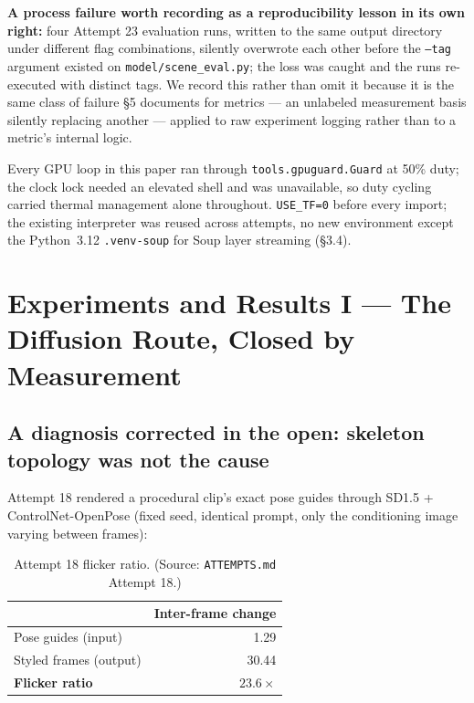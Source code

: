 \documentclass[11pt]{article}
\newcommand{\secsym}{\S}
\begin{document}
\textbf{A process failure worth recording as a reproducibility lesson in
its own right:} four Attempt 23 evaluation runs, written to the same
output directory under different flag combinations, silently overwrote
each other before the \texttt{--tag} argument existed on
\texttt{model/scene\_eval.py}; the loss was caught and the runs
re-executed with distinct tags. We record this rather than omit it
because it is the same class of failure \secsym5 documents for metrics
--- an unlabeled measurement basis silently replacing another --- applied
to raw experiment logging rather than to a metric's internal logic.

Every GPU loop in this paper ran through \texttt{tools.gpuguard.Guard} at
50\% duty; the clock lock needed an elevated shell and was unavailable, so
duty cycling carried thermal management alone throughout.
\texttt{USE\_TF=0} before every import; the existing interpreter was
reused across attempts, no new environment except the Python~3.12
\texttt{.venv-soup} for Soup layer streaming (\secsym3.4).

\section{Experiments and Results I --- The Diffusion Route, Closed by Measurement}
\label{sec:results1}

\subsection{A diagnosis corrected in the open: skeleton topology was not the cause}
\label{sec:diagnosiscorrected}

Attempt 18 rendered a procedural clip's exact pose guides through SD1.5 +
ControlNet-OpenPose (fixed seed, identical prompt, only the conditioning
image varying between frames):

\begin{table}[h]
\centering
\caption{Attempt 18 flicker ratio. (Source: \texttt{ATTEMPTS.md} Attempt 18.)}
\label{tab:a18flicker}
\begin{tabular}{@{}lr@{}}
\toprule
 & Inter-frame change \\
\midrule
Pose guides (input) & 1.29 \\
Styled frames (output) & 30.44 \\
\textbf{Flicker ratio} & $\mathbf{23.6\times}$ \\
\bottomrule
\end{tabular}
\end{table}
\end{document}
